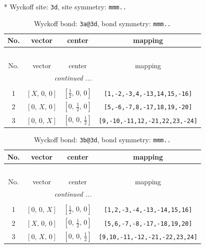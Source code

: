\documentclass[fleqn,8pt]{jsarticle}
\begin{document}
* Wyckoff site: {\tt 3d}, site symmetry: {\tt mmm..}
\renewcommand{\arraystretch}{1.2}
\begin{longtable}{cccc}
\caption{Wyckoff bond: {\tt 3a@3d}, bond symmetry: {\tt mmm..}}
 \\
 \hline \hline
No. & vector & center & mapping \\ \hline \endfirsthead

\multicolumn{3}{l}{\tablename\ \thetable{}} \\
 \hline \hline
No. & vector & center & mapping \\ \hline \endhead

 \hline \hline
\multicolumn{3}{r}{\footnotesize\it continued ...} \\ \endfoot

 \hline \hline
\multicolumn{3}{r}{} \\ \endlastfoot

1 & $\left[ X,\, 0,\, 0 \right]$ & $\left[ \frac{1}{2},\, 0,\, 0 \right]$ & {\tt [1,-2,-3,4,-13,14,15,-16]} \\ \hline
2 & $\left[ 0,\, X,\, 0 \right]$ & $\left[ 0,\, \frac{1}{2},\, 0 \right]$ & {\tt [5,-6,-7,8,-17,18,19,-20]} \\ \hline
3 & $\left[ 0,\, 0,\, X \right]$ & $\left[ 0,\, 0,\, \frac{1}{2} \right]$ & {\tt [9,-10,-11,12,-21,22,23,-24]} \\
\end{longtable}
\renewcommand{\arraystretch}{1.2}
\begin{longtable}{cccc}
\caption{Wyckoff bond: {\tt 3b@3d}, bond symmetry: {\tt mmm..}}
 \\
 \hline \hline
No. & vector & center & mapping \\ \hline \endfirsthead

\multicolumn{3}{l}{\tablename\ \thetable{}} \\
 \hline \hline
No. & vector & center & mapping \\ \hline \endhead

 \hline \hline
\multicolumn{3}{r}{\footnotesize\it continued ...} \\ \endfoot

 \hline \hline
\multicolumn{3}{r}{} \\ \endlastfoot

1 & $\left[ 0,\, 0,\, X \right]$ & $\left[ \frac{1}{2},\, 0,\, 0 \right]$ & {\tt [1,2,-3,-4,-13,-14,15,16]} \\ \hline
2 & $\left[ X,\, 0,\, 0 \right]$ & $\left[ 0,\, \frac{1}{2},\, 0 \right]$ & {\tt [5,6,-7,-8,-17,-18,19,20]} \\ \hline
3 & $\left[ 0,\, X,\, 0 \right]$ & $\left[ 0,\, 0,\, \frac{1}{2} \right]$ & {\tt [9,10,-11,-12,-21,-22,23,24]} \\
\end{longtable}
\end{document}
